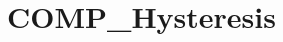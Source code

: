\hypertarget{group___c_o_m_p___hysteresis}{\section{C\-O\-M\-P\-\_\-\-Hysteresis}
\label{group___c_o_m_p___hysteresis}
}
